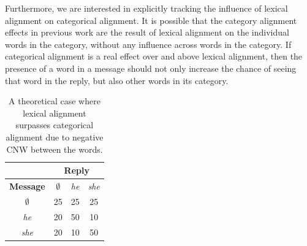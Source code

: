 \documentclass[11pt]{article}
\begin{document}

Furthermore, we are interested in explicitly tracking the influence of lexical alignment on categorical alignment.  It is possible that the category alignment effects in previous work are the result of lexical alignment on the individual words in the category, without any influence across words in the category. If categorical alignment is a real effect over and above lexical alignment, then the presence of a word in a message should not only increase the chance of seeing that word in the reply, but also other words in its category.


\begin{table}[t]
\begin{center}
\begin{tabular}{|c||c|c|c|}
\hline
& \multicolumn{3}{|c|}{\bf Reply} \\
\hline
\bf Message & $\emptyset$ & \textit{he} & \textit{she} \\ \hline
$\emptyset$ & 25 & 25 & 25\\
\textit{he} & 20 & 50 & 10 \\
\textit{she} & 20 & 10 & 50 \\
\hline
\end{tabular}
\end{center}
\caption{\label{table:cnw-example1} A theoretical case where lexical alignment surpasses categorical alignment due to negative CNW between the words.}
\end{table}
\end{document}
